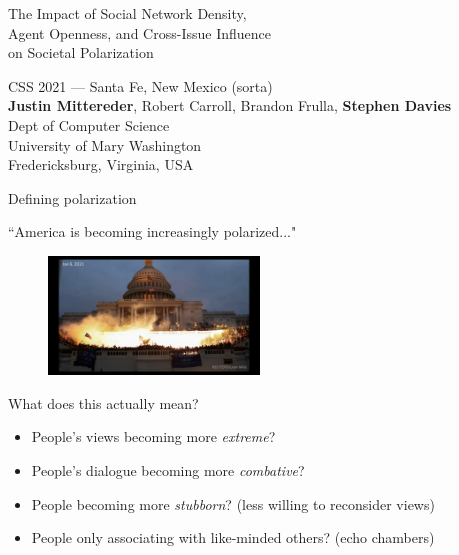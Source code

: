 \documentclass[12pt]{beamer}
\author{Mittereder, \textit{et. al.}}
\begin{document}
\begin{frame}[c]{} %

\begin{center}
\Large
The Impact of Social Network Density,\\Agent Openness, and Cross-Issue
Influence\\on Societal Polarization

\footnotesize
\vspace{.3in}
CSS 2021 --- Santa Fe, New Mexico (sorta)\\
\vspace{.1in}
\textbf{Justin Mittereder}, Robert Carroll, Brandon Frulla,
\textbf{Stephen Davies}\\
\scriptsize
\smallskip
Dept of Computer Science\\
University of Mary Washington\\
Fredericksburg, Virginia, USA\\
\end{center}

\end{frame}

\begin{frame}[c]{Defining polarization} %

\large

\centering
``America is becoming increasingly polarized..."

\vspace{-.2in}
\begin{figure}
\includegraphics[width=0.50\textwidth]{images/capitol.png}
\end{figure}
\pause
\vspace{-.2in}
What does this actually mean?
\vspace{-.15in}
\pause

\small
\begin{itemize}
\itemsep.1em
\item People's views becoming more \textit{extreme}?
\pause
\item People's dialogue becoming more \textit{combative}?
\pause
\item People becoming more \textit{stubborn}? (less willing to reconsider views)
\pause
\item People only associating with like-minded others? (echo chambers)
\end{itemize}

\end{frame}
\end{document}
